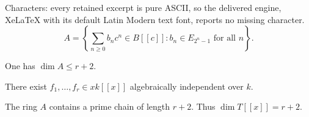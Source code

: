 \documentclass[10pt,a4paper]{amsart}
\begin{document}
Characters: every retained excerpt is pure ASCII, so the delivered engine, XeLaTeX with its default Latin Modern text font, reports no missing character.
\begin{equation}\label{eq:array}
 A=\left\{\sum_{n\ge0}b_nc^n\in B[[c]]:
                         b_n\in E_{2^n-1}\text{ for all }n\right\}.
\end{equation}

\begin{proposition}\label{prop:upper}
One has $\dim A\le r+2$.
\end{proposition}

\begin{lemma}\label{lem:exponentials}
There exist $f_1,\ldots,f_r\in xk[[x]]$ algebraically
independent over $k$.
\end{lemma}

\begin{proposition}\label{prop:lower}
The ring $A$ contains a prime chain of length $r+2$.
Thus $\dim T[[x]]=r+2$.
\end{proposition}
\end{document}
